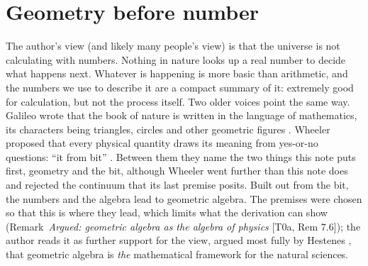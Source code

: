 \documentclass[11pt]{article}
\theoremstyle{definition}
\theoremstyle{plain}
\begin{document}
\noindent{}
\newpage

\section{Geometry before number}

\label{c:note.geometry-first.setting-geometry-before-number}
The author's view (and likely many people's view) is that the universe is not calculating with numbers. Nothing in nature looks up a real number to decide what happens next. Whatever is happening is more basic than arithmetic, and the numbers we use to describe it are a compact summary of it: extremely good for calculation, but not the process itself. Two older voices point the same way. Galileo wrote that the book of nature is written in the language of mathematics, its characters being triangles, circles and other geometric figures \cite{Galileo1623}. Wheeler proposed that every physical quantity draws its meaning from yes-or-no questions: ``it from bit'' \cite{Wheeler1990}. Between them they name the two things this note puts first, geometry and the bit, although Wheeler went further than this note does and rejected the continuum that its last premise posits. Built out from the bit, the numbers and the algebra lead to geometric algebra. The premises were chosen so that this is where they lead, which limits what the derivation can show (Remark~\emph{Argued: geometric algebra as the algebra of physics} [T0a, Rem 7.6]); the author reads it as further support for the view, argued most fully by Hestenes \cite{Hestenes2003Oersted}, that geometric algebra is \emph{the} mathematical framework for the natural sciences.
\end{document}
